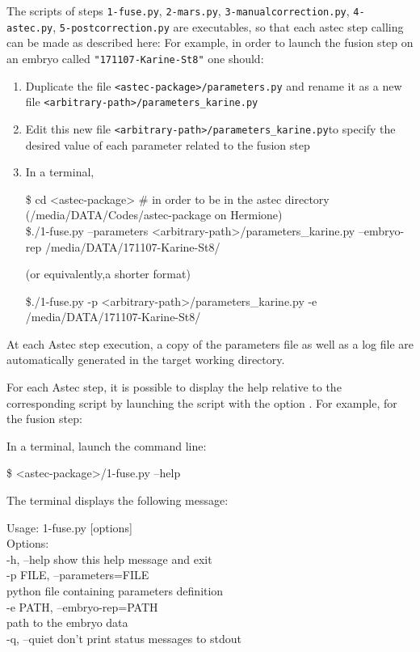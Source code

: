 The scripts of steps \texttt{1-fuse.py}, \texttt{2-mars.py}, \texttt{3-manualcorrection.py}, \texttt{4-astec.py}, \texttt{5-postcorrection.py} are executables, so that each astec step calling can be made as described here:
For example, in order to launch the fusion step on an embryo called \texttt{"171107-Karine-St8"} one should:
\begin{enumerate}
\item Duplicate the file \texttt{<astec-package>/parameters.py} and rename it as a new file \texttt{<arbitrary-path>/parameters\_karine.py}
\item Edit this new  file \texttt{<arbitrary-path>/parameters\_karine.py}to specify the desired value of each parameter related to the fusion step
\item In a terminal,
\begin{code}{0.8}
\$ cd <astec-package> \# in order to be in the astec directory (/media/DATA/Codes/astec-package on Hermione) \\
\$./1-fuse.py --parameters  <arbitrary-path>/parameters\_karine.py --embryo-rep /media/DATA/171107-Karine-St8/
\end{code}
 (or equivalently,a shorter format)
 \begin{code}{0.8}
\$./1-fuse.py -p  <arbitrary-path>/parameters\_karine.py -e /media/DATA/171107-Karine-St8/
\end{code}
\end{enumerate}


At each Astec step execution, a copy of the parameters file as well as a log file are automatically generated in the target working directory.

For each Astec step, it is possible to display the help relative to the corresponding script by launching the script with the option . For example, for the fusion step:

    In a terminal, launch the command line:
\begin{code}{0.8}
\$ <astec-package>/1-fuse.py --help
\end{code}
    The terminal displays the following message:
    
\begin{code}{0.8}
    Usage: 1-fuse.py [options] \\
    Options:\\
      -h, --help            show this help message and exit\\
      -p FILE, --parameters=FILE\\
                                python file containing parameters definition\\
      -e PATH, --embryo-rep=PATH\\
                                path to the embryo data\\
      -q, --quiet          don't print status messages to stdout\\
\end{code}





